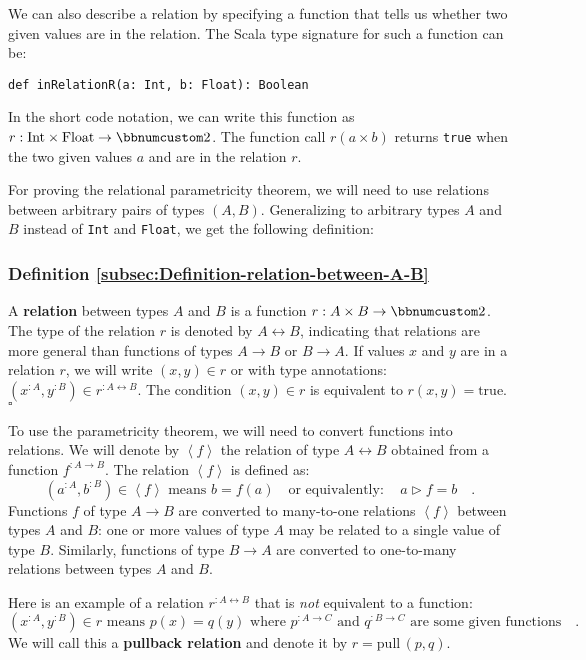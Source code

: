 We can also describe a relation by specifying a function that tells
us whether two given values are in the relation. The Scala type signature
for such a function can be:
\begin{lstlisting}
def inRelationR(a: Int, b: Float): Boolean
\end{lstlisting}
In the short code notation, we can write this function as $r:\text{Int}\times\text{Float}\rightarrow\bbnum 2$.
The function call $r\left(a\times b\right)$ returns \lstinline!true!
when the two given values $a$ and are in the relation $r$.

For proving the relational parametricity theorem, we will need to
use relations between arbitrary pairs of types $\left(A,B\right)$.
Generalizing to arbitrary types $A$ and $B$ instead of \lstinline!Int!
and \lstinline!Float!, we get the following definition:

\subsubsection{Definition \label{subsec:Definition-relation-between-A-B}\ref{subsec:Definition-relation-between-A-B}}

A \textbf{relation} between
types $A$ and $B$ is a function $r:A\times B\rightarrow\bbnum 2$.
The type of the relation $r$ is denoted by $A\leftrightarrow B$,
indicating that relations are more general than functions of types
$A\rightarrow B$ or $B\rightarrow A$. If values $x$ and $y$ are
in a relation $r$, we will write $(x,y)\in r$ or with type annotations:
$(x^{:A},y^{:B})\in r^{:A\leftrightarrow B}$. The condition $(x,y)\in r$
is equivalent to $r(x,y)=\text{true}$. $\square$

To use the parametricity theorem, we will need to convert functions
into relations. We will denote by $\left<f\right>$ the relation of
type $A\leftrightarrow B$ obtained from a function $f^{:A\rightarrow B}$.
The relation $\left<f\right>$ is defined as:
\[
(a^{:A},b^{:B})\in\left<f\right>\text{ means }b=f(a)\quad\text{or equivalently}:\quad a\triangleright f=b\quad.
\]
Functions $f$ of type $A\rightarrow B$ are converted to many-to-one
relations $\left<f\right>$ between types $A$ and $B$: one or more
values of type $A$ may be related to a single value of type $B$.
Similarly, functions of type $B\rightarrow A$ are converted to one-to-many
relations between types $A$ and $B$.

Here is an example of a relation $r^{:A\leftrightarrow B}$ that is
\emph{not} equivalent to a function:
\[
(x^{:A},y^{:B})\in r\text{ means }p(x)=q(y)\text{ where }p^{:A\rightarrow C}\text{ and }q^{:B\rightarrow C}\text{ are some given functions}\quad.
\]
We will call this a \textbf{pullback relation}
and denote it by $r=\text{pull}\,(p,q)$.

